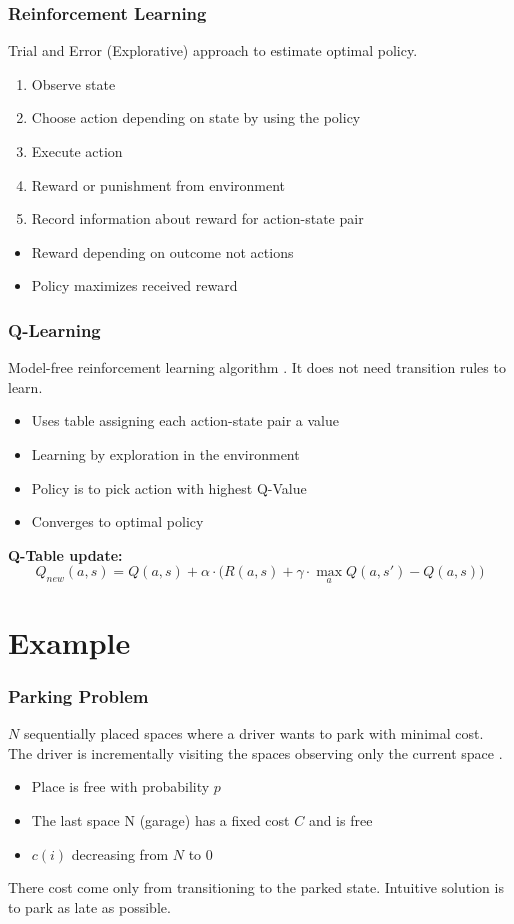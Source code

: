 \documentclass{beamer}
\begin{document}
\begin{frame}
	\frametitle{Reinforcement Learning}
	Trial and Error (Explorative) approach to estimate optimal policy.
	\begin{enumerate}	
		\item Observe state
		\item Choose action depending on state by using the policy
		\item Execute action
		\item Reward or punishment from environment
		\item Record information about reward for action-state pair
	\end{enumerate}
	\begin{itemize}
		\item Reward depending on outcome not actions
		\item Policy maximizes received reward
	\end{itemize}
\end{frame}

\begin{frame}
	\frametitle{Q-Learning}
	Model-free reinforcement learning algorithm \cite{watkins1989learning}. It does not need transition rules to learn.

	\begin{itemize}
		\item Uses table assigning each action-state pair a value
		\item Learning by exploration in the environment
		\item Policy is to pick action with highest Q-Value
		\item Converges to optimal policy \cite{watkins1992q}
	\end{itemize}
	
	\textbf{Q-Table update:}
	\begin{equation*}
		Q_{new}(a, s) = Q(a, s) + \alpha \cdot \bigg(R(a, s) + \gamma \cdot \max_a Q(a, s') - Q(a, s)\bigg)
	\end{equation*}
\end{frame}

\section{Example}
\begin{frame}
	\frametitle{Parking Problem}
	$N$ sequentially placed spaces where a driver wants to park with minimal cost. The driver is incrementally visiting the spaces observing only the current space \cite{bertsekas2019reinforcement}. 
	\begin{itemize}
		\item Place is free with probability $p$
		\item The last space N (garage) has a fixed cost $C$ and is free
		\item $c(i)$ decreasing from $N$ to $0$
	\end{itemize}
	There cost come only from transitioning to the parked state.
	Intuitive solution is to park as late as possible.
\end{frame}
\end{document}
